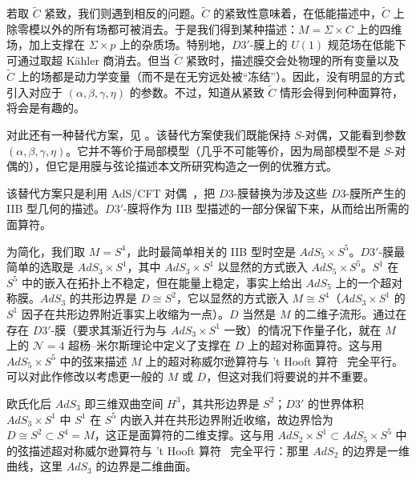 若取 $\tilde C$ 紧致，我们则遇到相反的问题。$\tilde C$ 的紧致性意味着，在低能描述中，$\tilde C$ 上除零模以外的所有场都可被消去。于是我们得到某种描述：$M=\Sigma\times C$ 上的四维场，加上支撑在 $\Sigma\times p$ 上的杂质场。特别地，$D3'$-膜上的 $U(1)$ 规范场在低能下可通过取超 Kähler 商消去。但当 $\tilde C$ 紧致时，描述膜交会处物理的所有变量以及 $\tilde C$ 上的场都是动力学变量（而不是在无穷远处被“冻结”）。因此，没有明显的方式引入对应于 $(\alpha,\beta,\gamma,\eta)$ 的参数。不过，知道从紧致 $\tilde C$ 情形会得到何种面算符，将会是有趣的。

\bigskip{}

对此还有一种替代方案，见 \cite{ref18}。该替代方案使我们既能保持 $S$-对偶，又能看到参数 $(\alpha,\beta,\gamma,\eta)$。它并不等价于局部模型（几乎不可能等价，因为局部模型不是 $S$-对偶的），但它是用膜与弦论描述本文所研究构造之一例的优雅方式。

该替代方案只是利用 AdS/CFT 对偶~\cite{ref85}，把 $D3$-膜替换为涉及这些 $D3$-膜所产生的 IIB 型几何的描述。$D3'$-膜将作为 IIB 型描述的一部分保留下来，从而给出所需的面算符。

为简化，我们取 $M=S^4$，此时最简单相关的 IIB 型时空是 $AdS_5\times S^5$。$D3'$-膜最简单的选取是 $AdS_3\times S^1$，其中 $AdS_3\times S^1$ 以显然的方式嵌入 $AdS_5\times S^5$。$S^1$ 在 $S^5$ 中的嵌入在拓扑上不稳定，但在能量上稳定，事实上给出 $AdS_5$ 上的一个超对称膜。$AdS_3$ 的共形边界是 $D\cong S^2$，它以显然的方式嵌入 $M\cong S^4$（$AdS_3\times S^1$ 的 $S^1$ 因子在共形边界附近事实上收缩为一点）。$D$ 当然是 $M$ 的二维子流形。通过在存在 $D3'$-膜（要求其渐近行为与 $AdS_3\times S^1$ 一致）的情况下作量子化，就在 $M$ 上的 ${\mathcal N}=4$ 超杨–米尔斯理论中定义了支撑在 $D$ 上的超对称面算符。这与用 $AdS_5\times S^5$ 中的弦来描述 $M$ 上的超对称威尔逊算符与 't Hooft 算符~\cite{ref86,ref87} 完全平行。可以对此作修改以考虑更一般的 $M$ 或 $D$，但这对我们将要说的并不重要。

\begin{yizhu}[含糊点拨]欧氏化后 $AdS_3$ 即三维双曲空间 $H^3$，其共形边界是 $S^2$；$D3'$ 的世界体积 $AdS_3\times S^1$ 中 $S^1$ 在 $S^5$ 内嵌入并在共形边界附近收缩，故边界恰为 $D\cong S^2\subset S^4=M$，这正是面算符的二维支撑。这与用 $AdS_2\times S^1\subset AdS_5\times S^5$ 中的弦描述超对称威尔逊算符与 't Hooft 算符~\cite{ref86,ref87} 完全平行：那里 $AdS_2$ 的边界是一维曲线，这里 $AdS_3$ 的边界是二维曲面。\end{yizhu}


